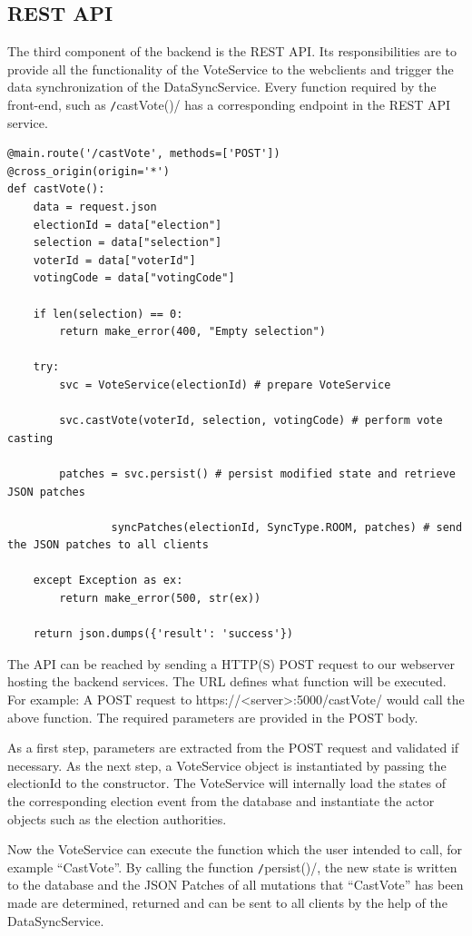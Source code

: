 \subsection{REST API}
The third component of the backend is the REST API. Its responsibilities are to provide all the functionality of the VoteService to the webclients and trigger the data synchronization of the DataSyncService. Every function required by the front-end, such as \texttt/castVote()/ has a corresponding endpoint in the REST API service.

\begin{verbatim}
@main.route('/castVote', methods=['POST'])
@cross_origin(origin='*')
def castVote():
    data = request.json
    electionId = data["election"]
    selection = data["selection"]
    voterId = data["voterId"]
    votingCode = data["votingCode"]

    if len(selection) == 0:
        return make_error(400, "Empty selection")

    try:        
        svc = VoteService(electionId) # prepare VoteService
        
        svc.castVote(voterId, selection, votingCode) # perform vote casting
        
        patches = svc.persist()	# persist modified state and retrieve JSON patches
        
				syncPatches(electionId, SyncType.ROOM, patches)	# send the JSON patches to all clients

    except Exception as ex:
        return make_error(500, str(ex))

    return json.dumps({'result': 'success'})
\end{verbatim}

The API can be reached by sending a HTTP(S) POST request to our webserver hosting the backend services. The URL defines what function will be executed. For example: A POST request to https://<server>:5000/castVote/ would call the above function. The required parameters are provided in the POST body.

As a first step, parameters are extracted from the POST request and validated if necessary. As the next step, a VoteService object is instantiated by passing the electionId to the constructor. The VoteService will internally load the states of the corresponding election event from the database and instantiate the actor objects such as the election authorities.

Now the VoteService can execute the function which the user intended to call, for example "`CastVote"'. By calling the function \texttt/persist()/, the new state is written to the database and the JSON Patches of all mutations that "`CastVote"' has been made are determined, returned and can be sent to all clients by the help of the DataSyncService.


